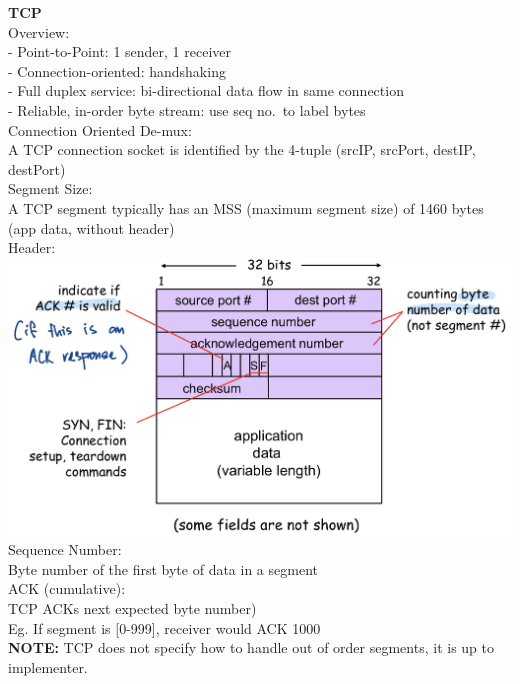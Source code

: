 \documentclass[10pt, a4paper]{article}
\newcommand{\highlight}[1]{{\color{red}\textbf{#1}}}
\newcommand{\blue}[1]{{\color{MidnightBlue}#1}}
\begin{document}
\begin{multicols*}{3}
		\textbf{TCP}\\
		Overview:\\
		- Point-to-Point: 1 sender, 1 receiver\\
		- Connection-oriented: handshaking\\
		- Full duplex service: bi-directional data flow in same connection\\
		- Reliable, in-order byte stream: use seq no.\ to label bytes\\

		Connection Oriented De-mux:\\
		A TCP connection socket is identified by the 4-tuple (srcIP, srcPort, destIP, destPort)\\

		Segment Size:\\
		A TCP segment typically has an MSS (maximum segment size) of 1460 bytes (app data, without header)\\

		Header:\\
		\includegraphics[scale=.14]{./assets/tcpHeader}\\

		Sequence Number:\\
		\blue{Byte number} of the \blue{first} byte of data in a segment\\

		ACK (cumulative):\\
		TCP ACKs next expected byte number)\\
		Eg. If segment is [0-999], receiver would ACK 1000\\
		\highlight{NOTE:} TCP does not specify how to handle \blue{out of order} segments, it is up to implementer.\\


\end{multicols*}
\end{document}

